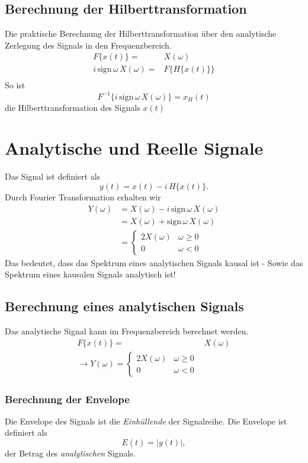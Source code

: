 \subsection*{Berechnung der Hilberttransformation}
Die praktische Berechnung der Hilberttransformation über den analytische Zerlegung des Signals in den Frequenzbereich.
\[
\begin{split}
F\{x(t)\} = & X(\omega)\\
i\,\mbox{sign}\,\omega\,X(\omega) = &F\{H\{x(t)\}\}\\
\end{split}
\]
So ist
\[
F^{-1}\{i\,\mbox{sign}\,\omega\,X(\omega)\} = x_H(t)
\]
die Hilberttransformation des Signals $x(t)$

\section{Analytische und Reelle Signale}
Das Signal ist definiert als
\[
y(t) = x(t) - i\,H\{x(t)\}.
\]
Durch Fourier Transformation erhalten wir
\[
\begin{split}
Y(\omega) & = X(\omega) - i \, \mbox{sign}\,\omega \, X(\omega)\\
& = X(\omega) + \mbox{sign}\,\omega \, X(\omega)\\
& =
\begin{cases}
2 X(\omega) & \omega \geq 0\\
0 & \omega < 0
\end{cases}
\end{split}
\]
Das bedeutet, dass das Spektrum eines analytischen Signals kausal ist - Sowie das Spektrum eines kausalen Signals analytisch ist!

\subsection{Berechnung eines analytischen Signals}
Das analytische Signal kann im Frequenzbereich berechnet werden.
\[
\begin{split}
F\{x(t)\} = & X(\omega)\\
\rightarrow Y(\omega) =
\begin{cases}
2 X(\omega) & \omega \geq 0\\
0 & \omega < 0
\end{cases}
\end{split}
\]

\subsubsection*{Berechnung der Envelope}
Die Envelope des Signals ist die \textit{Einhüllende} der Signalreihe. Die Envelope ist definiert als
\begin{equation}
E(t) = |y(t)|,
\end{equation} 
der Betrag des \textit{analytischen} Signals.

